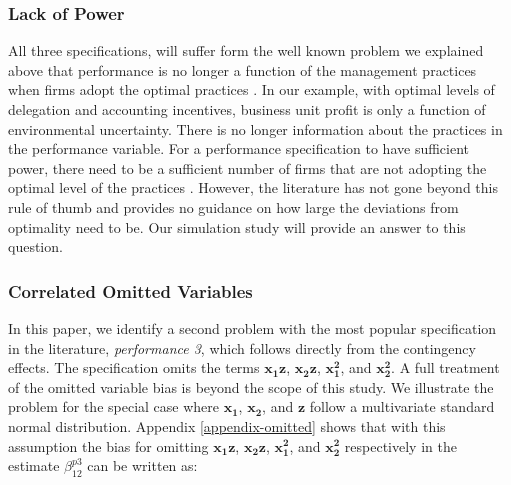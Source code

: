 \documentclass[12pt]{article}
\begin{document}
\subsubsection{Lack of Power}

All three specifications, will suffer form the well known problem we explained above that performance is no longer a function of the management practices when firms adopt the optimal practices \citep{Grabner2013}. In our example, with optimal levels of delegation and accounting incentives, business unit profit is only a function of environmental uncertainty. There is no longer information about the practices in the performance variable. For a performance specification to have sufficient power, there need to be a sufficient number of firms that are not adopting the optimal level of the practices \citep{Bedford2016, Carree2011,  Hofmann2015OrganizationalChoices}. However, the literature has not gone beyond this rule of thumb and provides no guidance on how large the deviations from optimality need to be. Our simulation study will provide an answer to this question.

\subsubsection{Correlated Omitted Variables}

In this paper, we identify a second problem with the most popular specification in the literature, \emph{performance 3}, which follows directly from the contingency effects. The specification omits the terms $\mathbf{x_1 z}$, $\mathbf{x_2 z}$, $\mathbf{x_1^2}$, and $\mathbf{x_2^2}$. A full treatment of the omitted variable bias is beyond the scope of this study. We illustrate the problem for the special case where $\mathbf{x_1}$, $\mathbf{x_2}$, and $\mathbf{z}$ follow a multivariate standard normal distribution. Appendix \ref{appendix-omitted} shows that with this assumption the bias for omitting $\mathbf{x_1 z}$, $\mathbf{x_2 z}$, $\mathbf{x_1^2}$, and $\mathbf{x_2^2}$ respectively in the estimate $\beta^{p3}_{12}$ can be written as:
\end{document}
